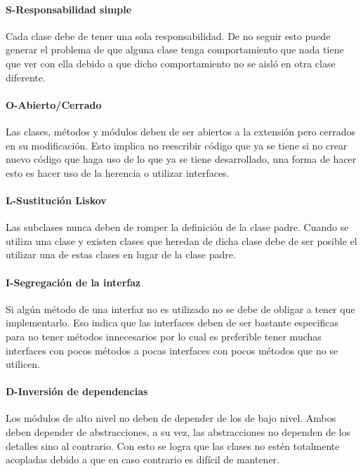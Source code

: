 \paragraph{S-Responsabilidad simple} Cada clase debe de tener una sola responsabilidad. De no seguir esto puede generar el problema de que alguna clase tenga comportamiento que nada tiene que ver con ella debido a que dicho comportamiento no se aisló en otra clase diferente. \cite{solidEjemplos}
\paragraph{O-Abierto/Cerrado} Las clases, métodos y módulos deben de ser abiertos a la extensión pero cerrados en su modificación. Esto implica no reescribir código que ya se tiene si no crear nuevo código que haga uso de lo que ya se tiene desarrollado, una forma de hacer esto es hacer uso de la herencia o utilizar interfaces.\cite{solidEjemplos}
\paragraph{L-Sustitución Liskov} Las subclases nunca deben de romper la definición de la clase padre. Cuando se utiliza una clase y existen clases que heredan de dicha clase debe de ser posible el utilizar una de estas clases en lugar de la clase padre.\cite{solidEjemplos}
\paragraph{I-Segregación de la interfaz} Si algún método de una interfaz no es utilizado no se debe de obligar a tener que implementarlo. Eso indica que las interfaces deben de ser bastante especificas para no tener métodos innecesarios por lo cual es preferible tener muchas interfaces con pocos métodos a pocas interfaces con pocos métodos que no se utilicen.\cite{solidEjemplos}
\paragraph{D-Inversión de dependencias} Los módulos de alto nivel no deben de depender de los de bajo nivel. Ambos deben depender de abstracciones, a su vez, las abstracciones no dependen de los detalles sino al contrario. Con esto se logra que las clases no estén totalmente acopladas debido a que en caso contrario es difícil de mantener. \cite{solidEjemplos}
